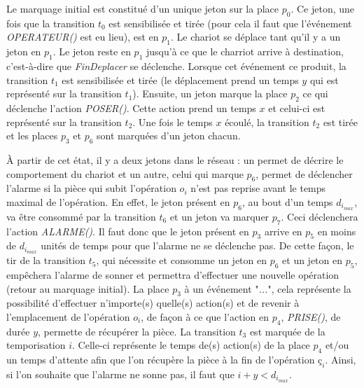 Le marquage initial est constitué d'un unique jeton sur la place $p_0$. Ce jeton, une fois que la transition $t_0$ est sensibilisée et tirée (pour cela il faut que l'événement \emph{OPERATEUR()} est eu lieu), est en $p_1$. Le chariot se déplace tant qu'il y a un jeton en $p_1$. Le jeton reste en $p_1$ jusqu'à ce que le charriot arrive à destination, c'est-à-dire que \emph{FinDeplacer} se déclenche. Lorsque cet événement ce produit, la transition $t_1$ est sensibilisée et tirée (le déplacement prend un temps $y$ qui est représenté sur la transition $t_1$). Ensuite, un jeton marque la place $p_2$ ce qui déclenche l'action \emph{POSER()}. Cette action prend un temps $x$ et celui-ci est représenté sur la transition $t_2$. Une fois le temps $x$ écoulé, la transition $t_2$ est tirée et les places $p_3$ et $p_6$ sont marquées d'un jeton chacun. 

À partir de cet état, il y a deux jetons dans le réseau : un permet de décrire le comportement du chariot et un autre, celui qui marque $p_6$, permet de déclencher l'alarme si la pièce qui subit l'opération $o_i$ n'est pas reprise avant le temps maximal de l'opération.  En effet, le jeton présent en $p_6$, au bout d'un temps $d_{i_{max}}$, va être consommé par la transition $t_6$ et un jeton va marquer $p_7$. Ceci déclenchera l'action \emph{ALARME()}.
Il faut donc que le jeton présent en $p_3$ arrive en $p_5$ en moins de $d_{i_{max}}$ unités de temps pour que l'alarme ne se déclenche pas. De cette façon, le tir de la transition $t_5$, qui nécessite et consomme un jeton en $p_6$ et un jeton en $p_5$, empêchera l'alarme de sonner et permettra d'effectuer une nouvelle opération (retour au marquage initial). 
La place $p_3$ à un événement "\emph{...}", cela représente la possibilité d'effectuer n'importe(s) quelle(s) action(s) et de revenir à l'emplacement de l'opération $o_i$, de façon à ce que l'action en $p_4$, \emph{PRISE()}, de durée $y$, permette de récupérer la pièce. La transition $t_3$ est marquée de la temporisation $i$. Celle-ci représente le temps de(s) action(s) de la place $p_4$ et/ou un temps d'attente afin que l'on récupère la pièce à la fin de l'opération $ç_i$. Ainsi, si l'on souhaite que l'alarme ne sonne pas, il faut que $i + y < d_{i_{max}}$.

